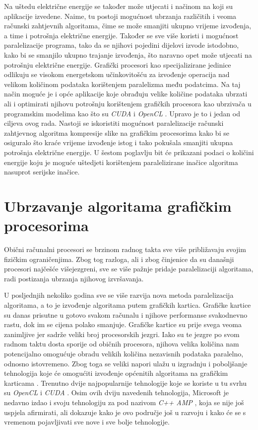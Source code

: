 \documentclass[times, utf8, zavrsni, numeric, sort]{fer}
\begin{document}
Na uštedu električne energije se također može utjecati i načinom na koji su aplikacije izvedene. Naime, tu postoji mogućnost ubrzanja različitih i veoma računski zahtjevnih algoritama, čime se može smanjiti ukupno vrijeme izvođenja, a time i potrošnja električne energije. Također se sve više koristi i mogućnost paralelizacije programa, tako da se njihovi pojedini dijelovi izvode istodobno, kako bi se smanjilo ukupno trajanje izvođenja, što naravno opet može utjecati na potrošnju električne energije. Grafički procesori kao specijalizirane jedinice odlikuju se visokom energetskom učinkovitošću za izvođenje operacija nad velikom količinom podataka korištenjem paralelizma među podatcima. Na taj način moguće je i opće aplikacije koje obrađuju velike količine podataka ubrzati ali i optimirati njihovu potrošnju korištenjem grafičkih procesora kao ubrzivača u programskim modelima kao što su \emph{CUDA} i \emph{OpenCL} \cite{Keckler:11}.
Upravo je to i jedan od ciljeva ovog rada. Nastoji se iskoristiti mogućnost paralelizacije računski zahtjevnog algoritma kompresije slike na grafičkim procesorima kako bi se osiguralo što kraće vrijeme izvođenje istog i tako pokušala smanjiti ukupna potrošnja električne energije. U šestom poglavlju bit će prikazani podaci o količini energije koju je moguće uštedjeti korištenjem paralelizirane inačice algoritma nasuprot serijske inačice.

\section{Ubrzavanje algoritama grafičkim procesorima}

Obični računalni procesori se brzinom radnog takta sve više približavaju svojim fizičkim ograničenjima. Zbog tog razloga, ali i zbog činjenice da su današnji procesori najčešće višejezgreni, sve se više pažnje pridaje paralelizaciji algoritama, radi postizanja ubrzanja njihovog izvršavanja.

U posljednjih nekoliko godina sve se više razvija nova metoda paralelizacija algoritama, a to je izvođenje algoritama putem grafičkih kartica. Grafičke kartice su danas prisutne u gotovo svakom računalu i njihove performanse svakodnevno rastu, dok im se cijena polako smanjuje. Grafičke kartice su prije svega veoma zanimljive jer sadrže veliki broj procesorskih jezgri. Iako su te jezgre po svom radnom taktu dosta sporije od običnih procesora, njihova velika količina nam potencijalno omogućuje obradu velikih količina nezavisnih podataka paralelno, odnosno istovremeno. Zbog toga se veliki napori ulažu u izgradnju i poboljšanje tehnologija koje će omogućiti izvođenje općenitih algoritama na grafičkim karticama . Trenutno  dvije najpopularnije tehnologije koje se koriste u tu svrhu su \emph{OpenCL} \cite{openclhome}  i \emph{CUDA} \cite{CUDAHOME}. Osim ovih dviju navedenih tehnologija, Microsoft je nedavno izdao i svoju tehnologiju za  pod nazivom \emph{C++ AMP} \cite{amp}, koja se nije još uspjela afirmirati, ali dokazuje kako je ovo područje još u razvoju i kako će se s vremenom pojavljivati sve nove i sve bolje tehnologije.
\end{document}
